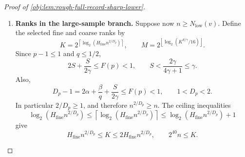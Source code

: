 \begin{proof}[Proof of \cref{obj:lem:rough-full-record-sharp-lower}]
\begin{enumerate}
\[<\frac12.
\]
The model-supremum bound is supplied by
\cref{obj:lem:paired-tent-full-record-lower}:
\[
d_0\le D_v.
\]
Together with the multiplier comparison, these canonical calculations give, for every positive-weight alternative support law,
\[
P\in\mathcal M_v,
\qquad
c_vn^{-E_4(p)}
\le c_0^{\mathrm e}n^{-E_0(p)}
\le d(P)<d_0.
\]
Finally, for every size-valid test \(\phi\), averaging over its independent uniform seed and using the total-variation expectation bound gives
\[
\begin{aligned}
\sup_{\substack{P\in\mathcal M_v\\
d(P)\ge c_0^{\mathrm e}n^{-E_0(p)}}}
\{1-\mathsf R_n(P,\phi)\}
&\ge\int\{1-\mathsf R_n(P,\phi)\}\,\pi_{1,n,v}(dP)\\
&\ge\frac9{10}
-\operatorname{TV}(P_0^{\otimes n},\overline P_1^{(n)})
>\frac25.
\end{aligned}
\]
Taking the infimum over size-valid tests proves the canonical risk bound
\[
B_n\!\left(v,c_0^{\mathrm e}n^{-E_0(p)}\right)\ge\frac25.
\]

For each test satisfying the size constraint, decreasing the separation enlarges the alternative set, so
\[
\sup_{\substack{P\in\mathcal M_v\\
d(P)\ge c_0^{\mathrm e}n^{-E_0(p)}}}
\{1-\mathsf R_n(P,\phi)\}
\le
\sup_{\substack{P\in\mathcal M_v\\
d(P)\ge c_vn^{-E_4(p)}}}
\{1-\mathsf R_n(P,\phi)\}.
\]
The positive-weight alternative supplied by the paired-tent construction makes both sets nonempty. Taking infima over the same size-valid tests and using its risk bound gives
\[
\frac25
\le B_n\!\left(v,c_0^{\mathrm e}n^{-E_0(p)}\right)
\le B_n\!\left(v,c_vn^{-E_4(p)}\right).
\]
Finally, \(n<N_{\mathrm{low}}(v)\) excludes the hypothesis
\(n\ge N_{\mathrm{low}}(v)\) of the additional rank and activity conclusions.

\item \textbf{Ranks in the large-sample branch.}
Suppose now \(n\ge N_{\mathrm{low}}(v)\). Define the selected fine and coarse ranks by
\[
K=
2^{\left\lceil\log_2(H_{\mathrm{fine}}n^{2/D_p})\right\rceil},
\qquad
M=
2^{\left\lfloor\log_2(K^{S/\gamma}/16)\right\rfloor}.
\]
Since \(p-1\le1\) and \(q\le1/2\),
\[
2S+\frac{S}{2\gamma}\le F(p)<1,
\qquad
S<\frac{2\gamma}{4\gamma+1}\le\gamma.
\]
Also,
\[
D_p-1
=
2\alpha+\frac{\beta}{q}+\frac{S}{2\gamma}
\le F(p)<1,
\qquad
1<D_p<2.
\]
In particular \(2/D_p\ge1\), and therefore \(n^{2/D_p}\ge n\).
The ceiling inequalities
\[
\log_2(H_{\mathrm{fine}}n^{2/D_p})
\le
\left\lceil\log_2(H_{\mathrm{fine}}n^{2/D_p})\right\rceil
\le
\log_2(H_{\mathrm{fine}}n^{2/D_p})+1
\]
give
\[
H_{\mathrm{fine}}n^{2/D_p}\le K
\le2H_{\mathrm{fine}}n^{2/D_p},
\qquad
2^{40}n\le K.
\]


\end{enumerate}
\end{proof}
